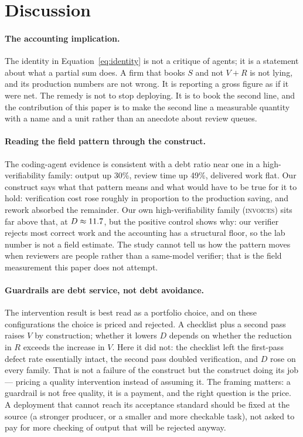 \documentclass[11pt]{article}
\newcommand{\D}{\ensuremath{D}}
\newcommand{\SV}{\ensuremath{S}}
\newcommand{\VV}{\ensuremath{V}}
\newcommand{\RV}{\ensuremath{R}}
\newcommand{\famname}[1]{\textsc{#1}}
\begin{document}
\section{Discussion}
\label{sec:discussion}

\paragraph{The accounting implication.} The identity in Equation~\eqref{eq:identity} is not a
critique of agents; it is a statement about what a partial sum does. A firm that books $\SV$ and
not $\VV+\RV$ is not lying, and its production numbers are not wrong. It is reporting a gross
figure as if it were net. The remedy is not to stop deploying. It is to book the second line, and
the contribution of this paper is to make the second line a measurable quantity with a name and a
unit rather than an anecdote about review queues.

\paragraph{Reading the field pattern through the construct.} The coding-agent evidence
\citep{chen2026} is consistent with a debt ratio near one in a high-verifiability family: output up
30\%, review time up 49\%, delivered work flat. Our construct says what that pattern means and
what would have to be true for it to hold: verification cost rose roughly in proportion to the
production saving, and rework absorbed the remainder. Our own high-verifiability family
(\famname{invoices}) sits far above that, at $\D\approx\VDqDInvoices$, but the positive control shows why:
our verifier rejects most correct work and the accounting has a structural floor, so the lab number
is not a field estimate. The study cannot tell us how the pattern moves when reviewers are people
rather than a same-model verifier; that is the field measurement this paper does not attempt.

\paragraph{Guardrails are debt service, not debt avoidance.} The intervention result is best read
as a portfolio choice, and on these configurations the choice is priced and rejected. A checklist
plus a second pass raises $\VV$ by construction; whether it lowers $\D$ depends on whether the
reduction in $\RV$ exceeds the increase in $\VV$. Here it did not: the checklist left the
first-pass defect rate essentially intact, the second pass doubled verification, and $\D$ rose on
every family. That is not a failure of the construct but the construct doing its job --- pricing a
quality intervention instead of assuming it. The framing matters: a guardrail is not free quality,
it is a payment, and the right question is the price. A deployment that cannot reach its
acceptance standard should be fixed at the source (a stronger producer, or a smaller and more
checkable task), not asked to pay for more checking of output that will be rejected anyway.
\end{document}
